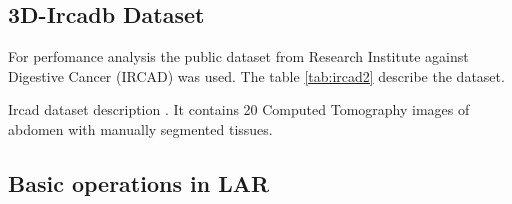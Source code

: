 \subsection{3D-Ircadb Dataset}

For perfomance analysis the public dataset from Research Institute against Digestive Cancer (IRCAD) \cite{ircadb} was used. 
The table 
\ref{tab:ircad2} describe the dataset.

% 

\begin{table}[h!]
\centering

\caption{Ircad dataset description \cite{ircadb}. It contains 20 Computed Tomography images of abdomen with 
manually segmented tissues.}
\label{tab:ircad2}
\end{table}


\subsection{Basic operations in LAR}
\label{sec:lar-example}

